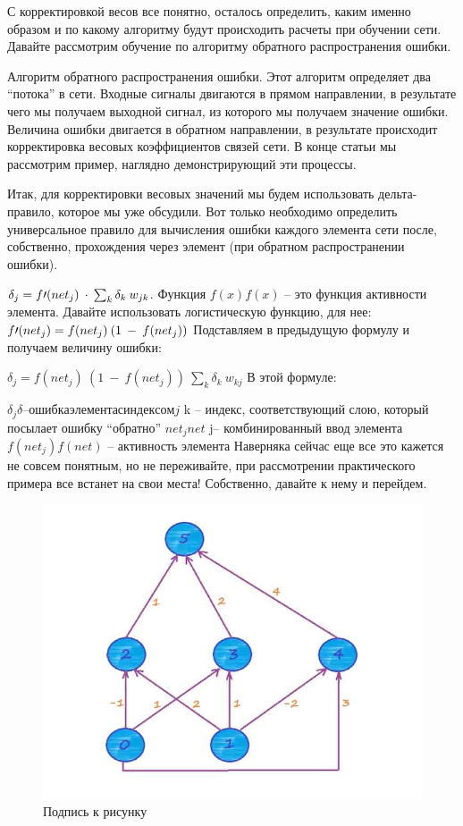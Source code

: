 \documentclass[12pt,a4paper]{report}
\begin{document}
С корректировкой весов все понятно, осталось определить, каким именно образом и по какому алгоритму будут происходить расчеты при обучении сети. Давайте рассмотрим обучение по алгоритму обратного распространения ошибки.

Алгоритм обратного распространения ошибки.
Этот алгоритм определяет два “потока” в сети. Входные сигналы двигаются в прямом направлении, в результате чего мы получаем выходной сигнал, из которого мы получаем значение ошибки. Величина ошибки двигается в обратном направлении, в результате происходит корректировка весовых коэффициентов связей сети. В конце статьи мы рассмотрим пример, наглядно демонстрирующий эти процессы.

Итак, для корректировки весовых значений мы будем использовать дельта-правило, которое мы уже обсудили. Вот только необходимо определить универсальное правило для вычисления ошибки каждого элемента сети после, собственно, прохождения через элемент (при обратном распространении ошибки).

$\delta_j = f{\Large{\prime}}(net_j)\medspace\cdot\medspace \sum_{k}{}{\delta_k\medspace w_{jk}}$. Функция $f(x)f(x)$ – это функция активности элемента. Давайте использовать логистическую функцию, для нее:
$f{\Large{\prime}}(net_j) = f(net_j)\medspace (1\medspace-\medspace f(net_j))$
Подставляем в предыдущую формулу и получаем величину ошибки:

$\delta_j = f(net_j)\medspace (1\medspace-\medspace f(net_j))\medspace \sum_{k}{}{\delta_k\medspace w_{kj}}$
В этой формуле:

$\delta_jδ  – ошибка элемента с индексом j$
k – индекс, соответствующий слою, который посылает ошибку “обратно”
$net_jnet$ 
j– комбинированный ввод элемента
$f(net_j)f(net)$ – активность элемента
Наверняка сейчас еще все это кажется не совсем понятным, но не переживайте, при рассмотрении практического примера все встанет на свои места! Собственно, давайте к нему и перейдем.

\begin{figure}
	\centering
	\includegraphics[width=\columnwidth]{weight}
	\caption{Подпись к рисунку}
	\end{figure}
\end{document}
